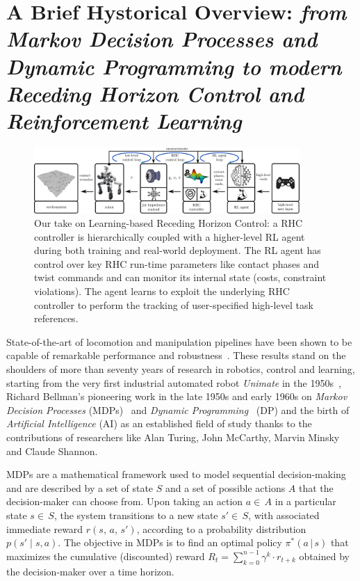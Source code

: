 \section{A Brief Hystorical Overview: \textnormal{\textit{from Markov Decision Processes and Dynamic Programming to modern Receding Horizon Control and Reinforcement Learning}}}
\begin{figure}[t]
	\centering
	\vspace{0.1cm}
	\includegraphics[width=0.9\textwidth]{imgs/learning_based_rhc.pdf}
	\caption{Our take on Learning-based Receding Horizon Control: a RHC controller is hierarchically coupled with a higher-level RL agent during both training and real-world deployment. The RL agent has control over key RHC run-time parameters like contact phases and twist commands and can monitor its internal state (costs, constraint violations). The agent learns to exploit the underlying RHC controller to perform the tracking of user-specified high-level task references.}
	\label{fig:lrhc_arch}
\end{figure}
State-of-the-art of locomotion and manipulation pipelines have been shown to be capable of remarkable performance and robustness~\cite{rl:schneider2023learning,rl:miki2024learning,web::atlas_grip_boston_dyn,web::lrhc_boston_dyn}. These results stand on the shoulders of more than seventy years of research in robotics, control and learning, starting from the very first industrial automated robot \textit{Unimate} in the 1950s~\cite{origins:xu2018fourth}, Richard Bellman's pioneering work in the late 1950s and early 1960s on \textit{Markov Decision Processes} (MDPs)~\cite{rl:bellman1957markovian} and \textit{Dynamic Programming}~\cite{rl:bellman1960dynamic} (DP) and the birth of \textit{Artificial Intelligence} (AI) as an established field of study thanks to the contributions of researchers like Alan Turing, John McCarthy, Marvin Minsky and Claude Shannon.

MDPs are a mathematical framework used to model sequential decision-making and are described by a set of state $S$ and a set of possible actions $A$ that the decision-maker can choose from. Upon taking an action $a\in\,A$ in a particular state $s\in\,S$, the system transitions to a new state $s'\in\,S$, with associated immediate reward $r(s,\,a,\,s')$, according to a probability distribution $p(s'\mid s, a)$. The objective in MDPs is to find an optimal policy $\pi^{*}(a\,\vert\,s)$ that maximizes the cumulative (discounted) reward $R_t = \sum_{k=0}^{n-1} \gamma^k \cdot r_{t+k}$ obtained by the decision-maker over a time horizon.

